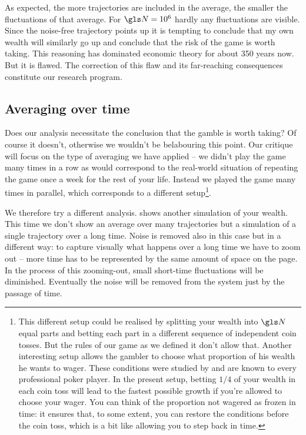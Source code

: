 \FloatBarrier
As expected, the more 
trajectories are included in the average, the smaller the fluctuations of 
that average. For $\N=10^6$ hardly any fluctuations are visible. Since the 
noise-free trajectory points up it is tempting to conclude that my own wealth will similarly go up and  conclude that the risk 
of the game is worth taking. This reasoning has dominated economic 
theory for about 350 years now. But it is flawed. The correction of this flaw and its far-reaching consequences constitute our research program.

\subsection{Averaging over time}
Does our analysis necessitate the conclusion that the gamble is worth taking? 
Of course it doesn't, otherwise we wouldn't be belabouring this point. 
 Our critique will focus on the type of averaging we have applied -- we didn't play the game many times
in a row as would correspond to the real-world situation of repeating the game once a week for the rest of your life. 
Instead we played the game many times in parallel, which corresponds to a different setup\footnote{This different setup could be realised by splitting your wealth into $\N$ equal parts and betting each part in a different sequence of independent coin tosses. But the rules of our game as we defined it don't allow that. Another interesting setup allows the gambler to choose what proportion of his wealth he wants to wager. These conditions were studied by  \cite{Kelly1956} and are known to every professional poker player. In the present setup, betting $1/4$ of your wealth in each coin toss will lead to the fastest possible growth if you're allowed to choose your wager. You can think of the proportion not wagered as frozen in time: it ensures that, to some extent, you can restore the conditions before the coin toss, which is a bit like allowing you to step back in time.}.

We therefore try a different analysis.  shows another simulation of your wealth. This time we don't show an average over many trajectories but a simulation of a single trajectory
over a long time. Noise is removed also in this case but in a different way: to capture visually what 
happens over a long time we have to zoom out -- more time has to be represented by 
the same amount of space on the page. In the process of this zooming-out, small 
short-time fluctuations will be diminished. Eventually the noise will be removed from the system 
just by the passage of time.

